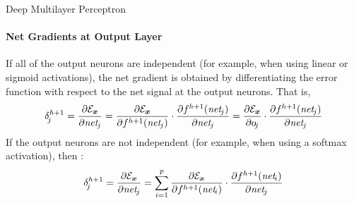 %
\begin{frame}{Deep Multilayer Perceptron}
\framesubtitle{Net Gradients at Output Layer}

If all of the output neurons are independent (for example, when
using linear or sigmoid activations), the net gradient is
obtained by differentiating the error function with
respect to the net signal at the output neurons. That is,
\begin{align*}
    \delta^{h+1}_{\!j} = \frac{\partial \cE_\bx}{\partial \net_{\!j}} =
    \frac{\partial \cE_\bx}{\partial f^{h+1}(\net_{\!j})} \cdot
\frac{\partial f^{h+1}(\net_{\!j})}{\partial \net_{\!j}} = 
\frac{\partial \cE_\bx}{\partial o_{\!j}} \cdot 
\frac{\partial f^{h+1}(\net_{\!j})}{\partial \net_{\!j}} 
\end{align*}
%
If the output neurons are not independent (for
example, when using a softmax activation), then :
\begin{align*}
    \delta^{h+1}_{\!j} = \frac{\partial {\mathcal E}_{\boldsymbol x}}{\partial \mathit{net}_{\!j}} =
    \sum^{p}_{i=1} \frac{\partial {\mathcal E}_{\boldsymbol x}}{\partial f^{h+1}(\mathit{net}_{\!i})} \cdot
\frac{\partial f^{h+1}(\mathit{net}_{\!i})}{\partial \mathit{net}_{\!j}}
\end{align*}

\end{frame}
